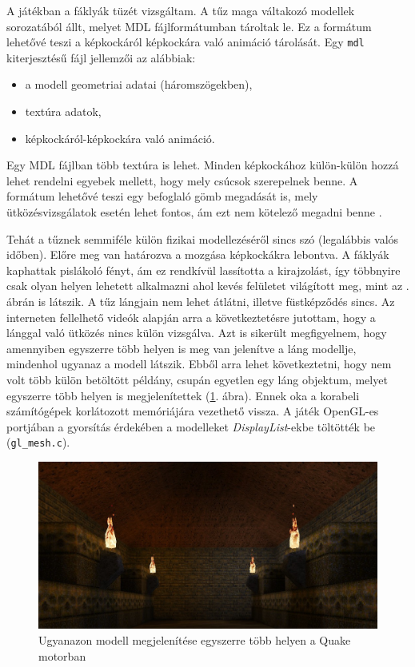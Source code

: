 A játékban a fáklyák tüzét vizsgáltam. A tűz maga váltakozó modellek sorozatából állt, melyet MDL fájlformátumban tároltak le. Ez a formátum lehetővé teszi a képkockáról képkockára való animáció tárolását. Egy \texttt{mdl} kiterjesztésű fájl jellemzői az alábbiak:
\begin{itemize} 
\item a modell geometriai adatai (háromszögekben),
\item textúra adatok,
\item képkockáról-képkockára való animáció.
\end{itemize} 
Egy MDL fájlban több textúra is lehet. Minden képkockához külön-külön hozzá lehet rendelni egyebek mellett, hogy mely csúcsok szerepelnek benne. A formátum lehetővé teszi egy befoglaló gömb megadását is, mely ütközésvizsgálatok esetén lehet fontos, ám ezt nem kötelező megadni benne \cite{MDLformat}. 


Tehát a tűznek semmiféle külön fizikai modellezéséről sincs szó (legalábbis valós időben). Előre meg van határozva a mozgása képkockákra lebontva. A fáklyák kaphattak pislákoló fényt, ám ez rendkívül lassította a kirajzolást, így többnyire csak olyan helyen lehetett alkalmazni ahol kevés felületet világított meg, mint az . ábrán is látszik. A tűz lángjain nem lehet átlátni, illetve füstképződés sincs. Az interneten fellelhető videók alapján arra a következtetésre jutottam, hogy a lánggal való ütközés nincs külön vizsgálva. Azt is sikerült megfigyelnem, hogy amennyiben egyszerre több helyen is meg van jelenítve a láng modellje, mindenhol ugyanaz a modell látszik. Ebből arra lehet következtetni, hogy nem volt több külön betöltött példány, csupán egyetlen egy láng objektum, melyet egyszerre több helyen is megjelenítettek (\ref{fig:quakeTorch}. ábra). Ennek oka a korabeli számítógépek korlátozott memóriájára vezethető vissza. A játék OpenGL-es portjában a gyorsítás érdekében a modelleket \textit{DisplayList}-ekbe töltötték be (\texttt{gl\_mesh.c}).

\begin{figure}[h]
\centering
\includegraphics[width=\textwidth]{kepek/quake_torches2.jpg}
\caption{Ugyanazon modell megjelenítése egyszerre több helyen a Quake motorban}
\label{fig:quakeTorch}
\end{figure}

